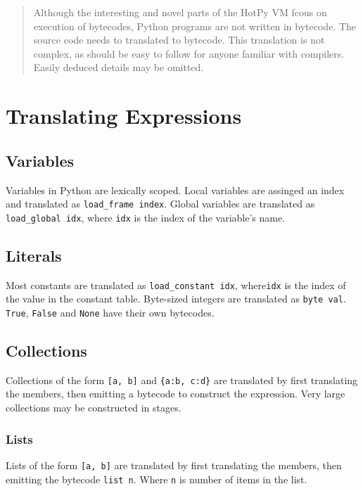 \documentclass[a4paper,10pt]{article}
\title{}
\author{}
\begin{document}
\maketitle

\begin{abstract}

Although the interesting and novel parts of the HotPy VM fcous on execution of bytecodes,
Python programs are not written in bytecode. The source code needs to translated to bytecode.
This translation is not complex, as should be easy to follow for anyone familiar with compilers.
Easily deduced details may be omitted.

\end{abstract}

\section{Translating Expressions}

\subsection{Variables}
Variables in Python are lexically scoped.
Local variables are assinged an index and translated as \verb|load_frame index|.
Global variables are translated as \verb|load_global idx|, where \verb|idx| is the index of the variable's name.

\subsection{Literals}
Most constants are translated as \verb|load_constant idx|, where\verb|idx| is the index of the value in the constant table.
Byte-sized integers are translated as \verb|byte val|. \verb|True|, \verb|False| and \verb|None| have their own bytecodes.

\subsection{Collections}

Collections of the form \verb|[a, b]| and \verb|{a:b, c:d}| are translated by first translating the members, then emitting a bytecode to construct the expression. Very large collections may be constructed in stages.

\subsubsection{Lists}
Lists of the form \verb|[a, b]|  are translated by first translating the members, then emitting the bytecode \verb|list n|.
Where \verb|n| is number of items in the list.
\end{document}
